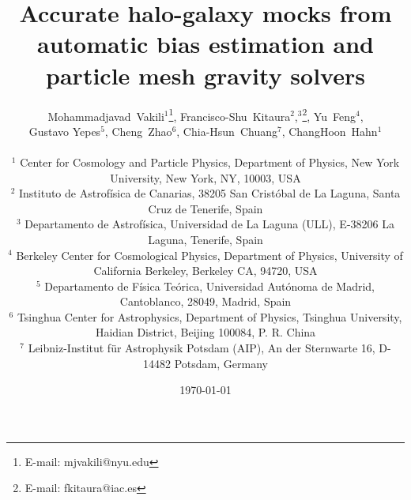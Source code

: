 \documentclass[english,usenatbib]{mn2e}
\begin{document}
\title[mock generation for galaxy surveys]
{
Accurate halo-galaxy mocks from automatic bias estimation and particle mesh gravity solvers 
}
\author[Vakili et al.]{
  \parbox{\textwidth}{
Mohammadjavad~Vakili$^1$\thanks{E-mail: mjvakili@nyu.edu},
Francisco-Shu~Kitaura$^2$,$^3$\thanks{E-mail: fkitaura@iac.es},
Yu~Feng$^4$,\\
Gustavo Yepes$^5$,
Cheng~Zhao$^6$,
Chia-Hsun~Chuang$^7$,
ChangHoon~Hahn$^1$
}
  \vspace*{10pt} \\
$^1$ Center for Cosmology and Particle Physics, Department of Physics, New York University, New York, NY, 10003, USA\\
$^2$ Instituto de Astrofísica de Canarias, 38205 San Cristóbal de La Laguna, Santa Cruz de Tenerife, Spain\\
$^{3}$ Departamento de Astrof{\'i}sica, Universidad de La Laguna (ULL), E-38206 La Laguna, Tenerife, Spain\\
$^4$ Berkeley Center for Cosmological Physics, Department of Physics, University of California Berkeley, Berkeley CA, 94720, USA\\
$^5$ Departamento de F{\'i}sica Te{\'o}rica,  Universidad Aut{\'o}noma de Madrid, Cantoblanco, 28049, Madrid, Spain\\ %
$^6$ Tsinghua Center for Astrophysics, Department of Physics, Tsinghua University, Haidian District, Beijing 100084, P. R. China\\ %
$^7$ Leibniz-Institut f\"ur Astrophysik Potsdam (AIP), An der Sternwarte 16, D-14482 Potsdam, Germany\\ %
}


\date{\today} 
\end{document}
